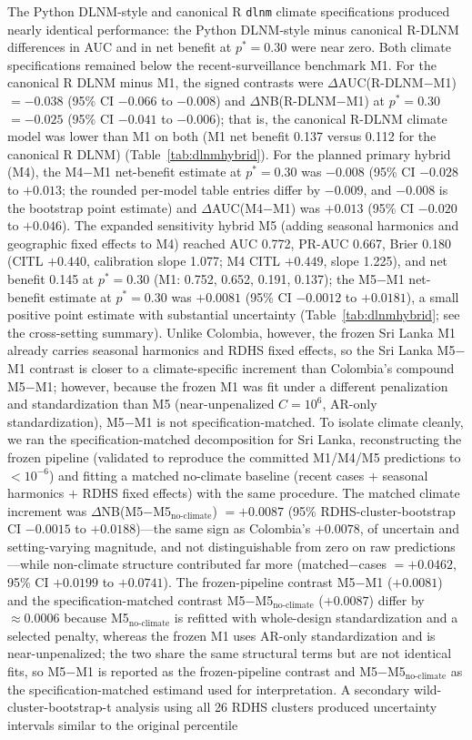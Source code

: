 \documentclass[11pt,a4paper]{article}
\begin{document}
The Python DLNM-style and canonical R \texttt{dlnm} climate specifications produced nearly identical performance: the Python DLNM-style minus canonical R-DLNM differences in AUC and in net benefit at $p^*=0.30$ were near zero. Both climate specifications remained below the recent-surveillance benchmark M1. For the canonical R DLNM minus M1, the signed contrasts were $\Delta$AUC(R\nobreakdash-DLNM$-$M1) $=-0.038$ (95\% CI $-0.066$ to $-0.008$) and $\Delta$NB(R\nobreakdash-DLNM$-$M1) at $p^*=0.30$ $=-0.025$ (95\% CI $-0.041$ to $-0.006$); that is, the canonical R-DLNM climate model was lower than M1 on both (M1 net benefit 0.137 versus 0.112 for the canonical R DLNM) (Table~\ref{tab:dlnmhybrid}). For the planned primary hybrid (M4), the M4$-$M1 net-benefit estimate at $p^*=0.30$ was $-0.008$ (95\% CI $-0.028$ to $+0.013$; the rounded per-model table entries differ by $-0.009$, and $-0.008$ is the bootstrap point estimate) and $\Delta$AUC(M4$-$M1) was $+0.013$ (95\% CI $-0.020$ to $+0.046$). The expanded sensitivity hybrid M5 (adding seasonal harmonics and geographic fixed effects to M4) reached AUC 0.772, PR-AUC 0.667, Brier 0.180 (CITL $+0.440$, calibration slope 1.077; M4 CITL $+0.449$, slope 1.225), and net benefit 0.145 at $p^*=0.30$ (M1: 0.752, 0.652, 0.191, 0.137); the M5$-$M1 net-benefit estimate at $p^*=0.30$ was $+0.0081$ (95\% CI $-0.0012$ to $+0.0181$), a small positive point estimate with substantial uncertainty (Table~\ref{tab:dlnmhybrid}; see the cross-setting summary). Unlike Colombia, however, the frozen Sri Lanka M1 already carries seasonal harmonics and RDHS fixed effects, so the Sri Lanka M5$-$M1 contrast is closer to a climate-specific increment than Colombia's compound M5$-$M1; however, because the frozen M1 was fit under a different penalization and standardization than M5 (near-unpenalized $C{=}10^{6}$, AR-only standardization), M5$-$M1 is not specification-matched. To isolate climate cleanly, we ran the specification-matched decomposition for Sri Lanka, reconstructing the frozen pipeline (validated to reproduce the committed M1/M4/M5 predictions to $<10^{-6}$) and fitting a matched no-climate baseline (recent cases $+$ seasonal harmonics $+$ RDHS fixed effects) with the same procedure. The matched climate increment was $\Delta$NB(M5$-$M5$_{\text{no-climate}}$) $=+0.0087$ (95\% RDHS-cluster-bootstrap CI $-0.0015$ to $+0.0188$)---the same sign as Colombia's $+0.0078$, of uncertain and setting-varying magnitude, and not distinguishable from zero on raw predictions---while non-climate structure contributed far more (matched$-$cases $=+0.0462$, 95\% CI $+0.0199$ to $+0.0741$). The frozen-pipeline contrast M5$-$M1 ($+0.0081$) and the specification-matched contrast M5$-$M5$_{\text{no-climate}}$ ($+0.0087$) differ by $\approx0.0006$ because M5$_{\text{no-climate}}$ is refitted with whole-design standardization and a selected penalty, whereas the frozen M1 uses AR-only standardization and is near-unpenalized; the two share the same structural terms but are not identical fits, so M5$-$M1 is reported as the frozen-pipeline contrast and M5$-$M5$_{\text{no-climate}}$ as the specification-matched estimand used for interpretation. A secondary wild-cluster-bootstrap-t analysis using all 26 RDHS clusters produced uncertainty intervals similar to the original percentile 
\end{document}
